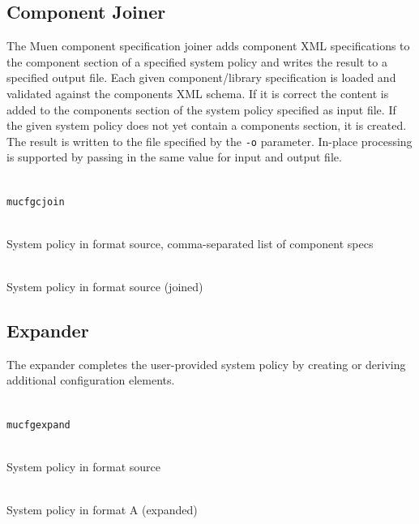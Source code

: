 \documentclass[a4paper,twoside,titlepage]{article}
\begin{document}
\subsection{Component Joiner}
\label{sec:tools-comps-joiner}
The Muen component specification joiner adds component XML specifications to
the component section of a specified system policy and writes the result to a
specified output file. Each given component/library specification is loaded and
validated against the components XML schema. If it is correct the content is
added to the components section of the system policy specified as input file.
If the given system policy does not yet contain a components section, it is
created. The result is written to the file specified by the \texttt{-o}
parameter.  In-place processing is supported by passing in the same value for
input and output file.

\begin{description} \itemsep1pt \parskip0pt
	\item[Name] \hfill \\
		\texttt{mucfgcjoin}
	\item[Input] \hfill \\
		System policy in format source, comma-separated list of component specs
	\item[Output] \hfill \\
		System policy in format source (joined)
\end{description}

\subsection{Expander}
\label{sec:tools-expander}
The expander completes the user-provided system policy by creating or deriving
additional configuration elements.

\begin{description} \itemsep1pt \parskip0pt
	\item[Name] \hfill \\
		\texttt{mucfgexpand}
	\item[Input] \hfill \\
		System policy in format source
	\item[Output] \hfill \\
		System policy in format A (expanded)
\end{description}
\end{document}
